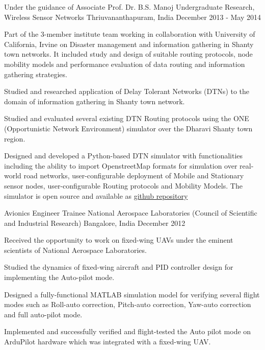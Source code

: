\begin{cventries}
{\begin{cvitems}
    \end{cvitems}
}
  \cventry
    {Under the guidance of Associate Prof. Dr. B.S. Manoj}
    {Undergraduate Research, Wireless Sensor Networks}
    {Thriuvananthapuram, India}
    {December 2013 - May 2014}
    { Part of the 3-member institute team working in collaboration with University of California, Irvine on Disaster management and information gathering in Shanty town networks. It included study and design of suitable routing protocols, node mobility models and performance evaluation of data routing and information gathering strategies. \linebreak
      \begin{cvitems}
        \item {Studied and researched application of Delay Tolerant Networks (DTNs) to the domain of information gathering in Shanty town network.}
        \item {Studied and evaluated several existing DTN Routing protocols using the ONE (Opportunistic Network Environment) simulator over the Dharavi Shanty town region.}
        \item{ Designed and developed a Python-based DTN simulator with functionalities including the ability to import OpenstreetMap formats for simulation over real-world road networks, user-configurable deployment of Mobile and Stationary sensor nodes, user-configurable Routing protocols and Mobility Models. The simulator is open source and available as  \href{https://github.com/codeahead14/pySim}{github repository}
        }
      \end{cvitems} 
    }
  \cventry
    {Avionics Engineer Trainee}
    {National Aerospace Laboratories (Council of Scientific and Industrial Research)}
    {Bangalore, India}
    {December 2012}
    {Received the opportunity to work on fixed-wing UAVs under the eminent scientists of National Aerospace Laboratories. \linebreak
      \begin{cvitems}
        \item {Studied the dynamics of fixed-wing aircraft and PID controller design for implementing the Auto-pilot mode.}
        \item{Designed a fully-functional MATLAB simulation model for verifying several flight modes such as Roll-auto correction, Pitch-auto correction, Yaw-auto correction and full auto-pilot mode.}
        \item{Implemented and successfully verified and flight-tested the Auto pilot mode on ArduPilot hardware which was integrated with a fixed-wing UAV.}
      \end{cvitems}
    }
    
\end{cventries}
